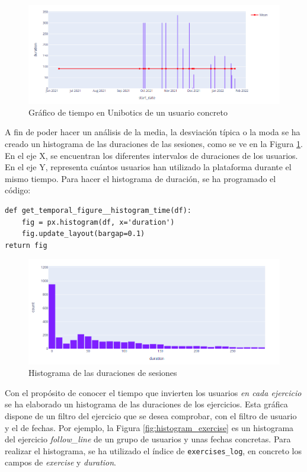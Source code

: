 \begin{figure}[H]
    \centering
    \includegraphics[width=17cm, keepaspectratio]{img/time_user.png}
    \caption{Gráfico de tiempo en Unibotics de un usuario concreto}
    \label{fig:time_user}
\end{figure}

A fin de poder hacer un análisis de la media, la desviación típica o la moda se ha creado un histograma de las duraciones de las sesiones, como se ve en la Figura \ref{fig:time_user}. En el eje X, se encuentran los diferentes intervalos de duraciones de los usuarios. En el eje Y, representa cuántos usuarios han utilizado la plataforma durante el mismo tiempo. Para hacer el histograma de duración, se ha programado el código:
\begin{lstlisting}
def get_temporal_figure__histogram_time(df):
    fig = px.histogram(df, x='duration')
    fig.update_layout(bargap=0.1)
return fig
\end{lstlisting}

\begin{figure}[H]
    \centering
    \includegraphics[width=15cm, keepaspectratio]{img/time_histogram.png}
    \caption{Histograma de las duraciones de sesiones}
    \label{fig:time_histogram}
\end{figure}
\newpage
Con el propósito de conocer el tiempo que invierten los usuarios \textit{en cada ejercicio} se ha elaborado un histograma de las duraciones de los ejercicios. Esta gráfica dispone de un filtro del ejercicio que se desea comprobar, con el filtro de usuario y el de fechas. Por ejemplo, la Figura \ref{fig:histogram_exercise} es un histograma del ejercicio \textit{follow\_line}  de un grupo de usuarios y unas fechas concretas. Para realizar el histograma, se ha utilizado el índice de \texttt{exercises\_log}, en concreto los campos de \textit{exercise} y \textit{duration}.

